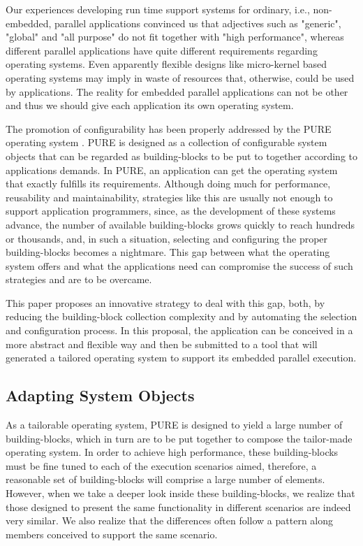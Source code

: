 \documentclass[11pt]{article}
\begin{document}
	Our experiences developing run time support systems for ordinary, i.e., non-embedded, parallel applications \cite{Preikschat:94, Froehlich:96b} convinced us that adjectives such as "generic", "global" and "all purpose" do not fit together with "high performance", whereas different parallel applications have quite different requirements regarding operating systems. Even apparently flexible designs like micro-kernel based operating systems may imply in waste of resources that, otherwise, could be used by applications. The reality for embedded parallel applications can not be other and thus we should give each application its own operating system.

	The promotion of configurability has been properly addressed by the PURE operating system \cite{Schoen:98}. PURE is designed as a collection of configurable system objects that can be regarded as building-blocks to be put to together according to applications demands. In PURE, an application can get the operating system that exactly fulfills its requirements. Although doing much for performance, reusability and maintainability, strategies like this are usually not enough to support application programmers, since, as the development of these systems advance, the number of available building-blocks grows quickly to reach hundreds or thousands, and, in such a situation, selecting and configuring the proper building-blocks becomes a nightmare. This gap between what the operating system offers and what the applications need can compromise the success of such strategies and are to be overcame.

	This paper proposes an innovative strategy to deal with this gap, both, by reducing the building-block collection  complexity and by automating the selection and configuration process. In this proposal, the application can be conceived in a more abstract and flexible way and then be submitted to a tool that will generated a tailored operating system to support its embedded parallel execution.


\subsection*{Adapting System Objects}

	As a tailorable operating system, PURE is designed to yield a large number of building-blocks, which in turn are to be put together to compose the tailor-made operating system. In order to achieve high performance, these building-blocks must be fine tuned to each of the execution scenarios aimed, therefore, a reasonable set of building-blocks will comprise a large number of elements. However, when we take a deeper look inside these building-blocks, we realize that those designed to present the same functionality in different scenarios are indeed very similar. We also realize that the differences often follow a pattern along members conceived to support the same scenario.
\end{document}
